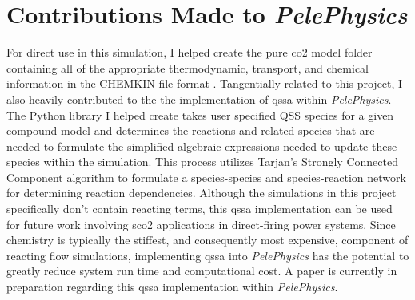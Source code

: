 \section{Contributions Made to \textit{PelePhysics}}
For direct use in this simulation, I helped create the pure \gls{co2} model folder containing all of the appropriate thermodynamic, transport, and chemical information in the CHEMKIN file format \cite{kee1989chemkin}. Tangentially related to this project, I also heavily contributed to the the implementation of \gls{qssa} within \textit{PelePhysics}. The Python library I helped create takes user specified QSS species for a given compound model and determines the reactions and related species that are needed to formulate the simplified algebraic expressions needed to update these species within the simulation. This process utilizes Tarjan's Strongly Connected Component algorithm \cite{tarjan1972depth} to formulate a species-species and species-reaction network for determining reaction dependencies. Although the simulations in this project specifically don't contain reacting terms, this \gls{qssa} implementation can be used for future work involving \gls{sco2} applications in direct-firing power systems. Since chemistry is typically the stiffest, and consequently most expensive, component of reacting flow simulations, implementing \gls{qssa} into \textit{PelePhysics} has the potential to greatly reduce system run time and computational cost. A paper is currently in preparation regarding this \gls{qssa} implementation within \textit{PelePhysics}.













